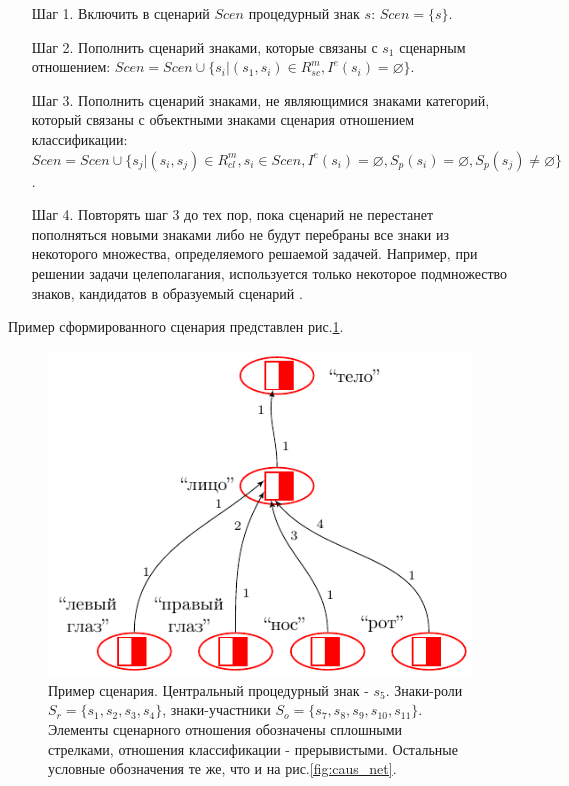 \documentclass[12pt]{scrartcl}
\begin{document}
	\begin{itemize}
		\item[Шаг 1.] Включить в сценарий $Scen$ процедурный знак $s$: $Scen=\{s\}$.
		\item[Шаг 2.] Пополнить сценарий знаками, которые связаны с $s_1$ сценарным отношением: $Scen=Scen\cup\{s_i|(s_1,s_i)\in R_{sc}^m, I^e(s_i)=\varnothing\}$.
		\item[Шаг 3.] Пополнить сценарий знаками, не являющимися знаками категорий, который связаны с объектными знаками сценария отношением классификации: $Scen=Scen\cup\{s_j|(s_i,s_j)\in R_{cl}^m, s_i\in Scen, I^e(s_i)=\varnothing, S_p(s_i)=\varnothing, S_p(s_j)\not=\varnothing\}$.
		\item[Шаг 4.] Повторять шаг 3 до тех пор, пока сценарий не перестанет пополняться новыми знаками либо не будут перебраны все знаки из некоторого множества, определяемого решаемой задачей. Например, при решении задачи целеполагания, используется только некоторое подмножество знаков, кандидатов в образуемый сценарий \cite{Osipov2014c}.
	\end{itemize}
	
	Пример сформированного сценария представлен рис.\ref{fig:scenarion}.
	
	\begin{figure}[h]
		\centering
		\includegraphics[width=\textwidth,page=4]{examples/causnet/caus_net_colored}
		\caption{Пример сценария. Центральный процедурный знак - $s_5$. Знаки-роли $S_r=\{s_1,s_2,s_3,s_4\}$, знаки-участники $S_o=\{s_7,s_8,s_9,s_{10},s_{11}\}$. Элементы сценарного отношения обозначены сплошными стрелками, отношения классификации - прерывистыми. Остальные условные обозначения те же, что и на рис.\ref{fig:caus_net}.}
		\label{fig:scenarion}		
	\end{figure}
\end{document}
